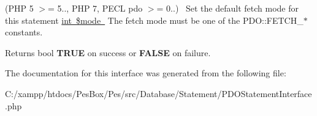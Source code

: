 (P\+HP 5 $>$= 5.., P\+HP 7, P\+E\+CL pdo $>$= 0..)~\newline
 Set the default fetch mode for this statement \mbox{\hyperlink{}{int \$mode }} The fetch mode must be one of the P\+D\+O\+::\+F\+E\+T\+C\+H\+\_\+$\ast$ constants. 

\begin{DoxyReturn}{Returns}
bool {\bfseries T\+R\+UE} on success or {\bfseries F\+A\+L\+SE} on failure. 
\end{DoxyReturn}


The documentation for this interface was generated from the following file\+:\begin{DoxyCompactItemize}
\item 
C\+:/xampp/htdocs/\+Pes\+Box/\+Pes/src/\+Database/\+Statement/P\+D\+O\+Statement\+Interface.\+php\end{DoxyCompactItemize}

